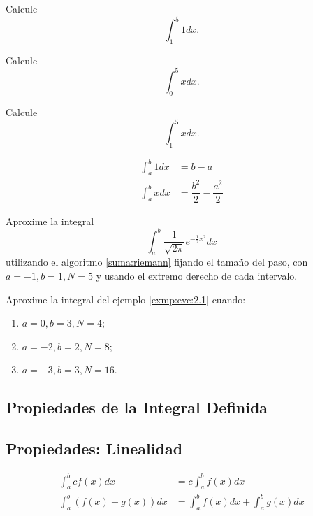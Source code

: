 	\begin{problema}
		Calcule
		$$\int_{1}^{5}1dx.$$
	\end{problema}
	



	\begin{problema}
		\label{ayr:exmp:23.3a}
		Calcule
		$$\int_{0}^{5}xdx.$$
	\end{problema}
	



	\begin{problema}
		\label{ayr:exmp:23.3b}
		Calcule
		$$\int_{1}^{5}xdx.$$
	\end{problema}
	



	\begin{prop}
		\begin{align}
			\label{ayr:23.2.1}
			\int_{a}^{b}1dx&=b-a\\ 
			\label{ayr:23.2.2}
			\int_{a}^{b}xdx&=\dfrac{b^{2}}{2}-\dfrac{a^{2}}{2}
		\end{align}
		
	\end{prop}
	



	\begin{problema}
		\label{exmp:evc:2.1}
		Aproxime la integral
		$$
		\int_{a}^{b} \dfrac{1}{\sqrt{2\pi}}e^{-\frac{1}{2}x^{2}}dx
		$$
		utilizando el algoritmo \ref{suma:riemann} fijando el tamaño del paso, con $a=-1, b=1, N=5$ y usando el extremo derecho de cada intervalo.
	\end{problema}



	\begin{problema}
		Aproxime la integral del ejemplo \ref{exmp:evc:2.1} cuando:
		\begin{enumerate}
			\item $a=0, b=3, N=4;$  
			\item $a=-2, b=2, N=8;$  
			\item $a=-3, b=3, N=16.$
		\end{enumerate}
		
	\end{problema}
	



\subsection{Propiedades de la Integral Definida}


	\subsection{Propiedades: Linealidad}
	\begin{align}
		\label{ayr:23.3}
		\int_{a}^{b} c f(x)dx&=c \int_{a}^{b}f(x)dx \\
		\label{ayr:23.5}
		\int_{a}^{b} \left( f(x)+g(x) \right)dx&= \int_{a}^{b}f(x)dx + \int_{a}^{b}g(x)dx
	\end{align}
	



